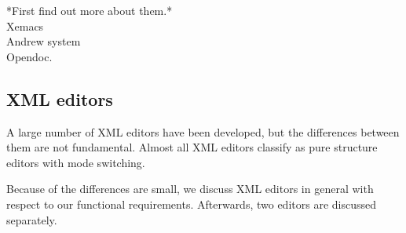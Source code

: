 \bc
\toHere     %


*First find out more about them.*\\
Xemacs\\
Andrew system\\
Opendoc.\\

\fromHere  %


\ec

%																
\subsection{XML editors} \label{sect:xmlEditors}

A large number of XML editors have been developed, but the differences between them are not fundamental. Almost all XML editors classify as pure structure editors with mode switching. 

Because of the differences are small, we discuss XML editors in general with respect to our functional requirements. Afterwards, two  editors are discussed separately.


